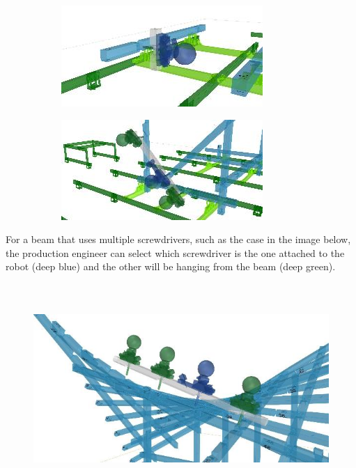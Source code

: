 \documentclass[11pt]{book}
\begin{document}
\begin{figure}[H]
\centering
\begin{subfigure}[b]{0.45\textwidth}
\centering
\includegraphics[width=\textwidth]{./images/image8.jpeg}
\end{subfigure}
\hfill
\begin{subfigure}[b]{0.45\textwidth}
\centering
\includegraphics[width=\textwidth]{./images/image9.jpeg}
\end{subfigure}
\end{figure}


For a beam that uses multiple screwdrivers, such as the case in the image below, the production engineer can select which screwdriver is the one attached to the robot (deep blue) and the other will be hanging from the beam (deep green).

\begin{figure}[H]
\includegraphics[width=15.92cm,height=7.97cm]{./images/image10.jpeg}
\end{figure}
\end{document}
